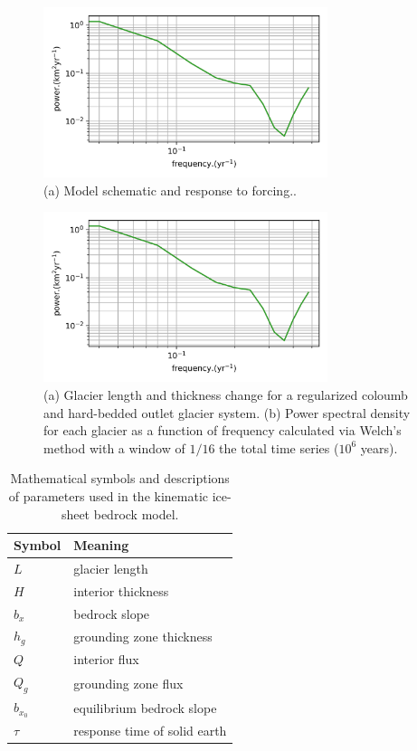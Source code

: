 \documentclass[tc, manuscript]{copernicus}
\begin{document}
\begin{figure}[t]
\includegraphics[width=8.3cm]{../figures/simulation0203.png}
\caption{(a) Model schematic and response to forcing..}
\end{figure}


\begin{figure}[t]
\includegraphics[width=8.3cm]{../figures/simulation0203.png}
\caption{(a) Glacier length and thickness change for a regularized coloumb and hard-bedded outlet glacier system. (b) Power spectral density for each glacier as a function of frequency calculated via Welch's method with a window of $1/16$ the total time series ($10^6$ years).}
\end{figure}



\begin{table}[h]
    \begin{tabular}{l|l}
        Symbol & Meaning \\
        \hline
        $L$ & glacier length \\
        $H$ & interior thickness \\
        $b_x$ & bedrock slope \\
        $h_g$ & grounding zone thickness \\
        $Q$ & interior flux \\
        $Q_g$ & grounding zone flux \\
        $b_{x_0}$ & equilibrium bedrock slope \\
        $\tau$ & response time of solid earth  \\
    \end{tabular}
    \caption{Mathematical symbols and descriptions of parameters used in the kinematic ice-sheet bedrock model.}
\end{table}
\end{document}
